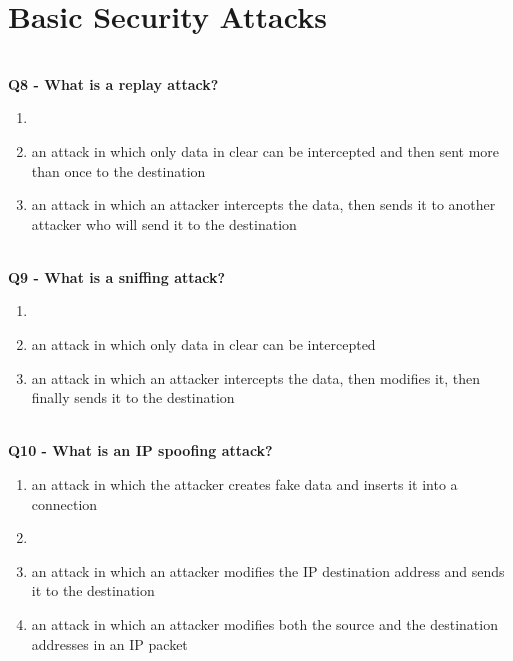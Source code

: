 \section{Basic Security Attacks}


\textbf{\\Q8 - What is a replay attack?}
\begin{enumerate}
	\item[A.] 
	\item[B.] an attack in which only data in clear can be intercepted and then sent more than once to the destination
	\item[C.] an attack in which an attacker intercepts the data, then sends it to another attacker who will send it to the destination
\end{enumerate}


\textbf{\\Q9 - What is a sniffing attack?}
\begin{enumerate}
	\item[A.] 
	\item[B.] an attack in which only data in clear can be intercepted
	\item[C.] an attack in which an attacker intercepts the data, then modifies it, then finally sends it to the destination
\end{enumerate}

\textbf{\\Q10 - What is an IP spoofing attack?}
\begin{enumerate}
	\item[A.] an attack in which the attacker creates fake data and inserts it into a connection
	\item[B.] 
	\item[C.] an attack in which an attacker modifies the IP destination address and sends it to the destination
	\item[D.] an attack in which an attacker modifies both the source and the destination addresses in an IP packet
\end{enumerate}

